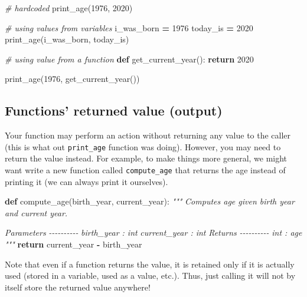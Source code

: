 \documentclass[
]{book}
\newenvironment{Shaded}{\begin{snugshade}}{\end{snugshade}}
\newcommand{\CommentTok}[1]{\textcolor[rgb]{0.56,0.35,0.01}{\textit{#1}}}
\newcommand{\ControlFlowTok}[1]{\textcolor[rgb]{0.13,0.29,0.53}{\textbf{#1}}}
\newcommand{\DecValTok}[1]{\textcolor[rgb]{0.00,0.00,0.81}{#1}}
\newcommand{\KeywordTok}[1]{\textcolor[rgb]{0.13,0.29,0.53}{\textbf{#1}}}
\newcommand{\NormalTok}[1]{#1}
\newcommand{\OperatorTok}[1]{\textcolor[rgb]{0.81,0.36,0.00}{\textbf{#1}}}
\begin{document}
\begin{Shaded}
\begin{Highlighting}[]
\CommentTok{\# hardcoded}
\NormalTok{print\_age(}\DecValTok{1976}\NormalTok{, }\DecValTok{2020}\NormalTok{)}

\CommentTok{\# using values from variables}
\NormalTok{i\_was\_born }\OperatorTok{=} \DecValTok{1976}
\NormalTok{today\_is }\OperatorTok{=} \DecValTok{2020}
\NormalTok{print\_age(i\_was\_born, today\_is)}

\CommentTok{\# using value from a function}
\KeywordTok{def}\NormalTok{ get\_current\_year():}
    \ControlFlowTok{return} \DecValTok{2020}

\NormalTok{print\_age(}\DecValTok{1976}\NormalTok{, get\_current\_year())}
\end{Highlighting}
\end{Shaded}

\hypertarget{functions-returned-value-output}{%
\subsection{Functions' returned value (output)}\label{functions-returned-value-output}}

Your function may perform an action without returning any value to the caller (this is what out \texttt{print\_age} function was doing). However, you may need to return the value instead. For example, to make things more general, we might want write a new function called \texttt{compute\_age} that returns the age instead of printing it (we can always print it ourselves).

\begin{Shaded}
\begin{Highlighting}[]
\KeywordTok{def}\NormalTok{ compute\_age(birth\_year, current\_year):}
    \CommentTok{"""}
\CommentTok{    Computes age given birth year and current year.}

\CommentTok{    Parameters}
\CommentTok{    {-}{-}{-}{-}{-}{-}{-}{-}{-}{-}}
\CommentTok{    birth\_year : int}
\CommentTok{    current\_year : int}
\CommentTok{    }
\CommentTok{    Returns}
\CommentTok{    {-}{-}{-}{-}{-}{-}{-}{-}{-}{-}}
\CommentTok{    int : age}
\CommentTok{    """}
    \ControlFlowTok{return}\NormalTok{ current\_year }\OperatorTok{{-}}\NormalTok{ birth\_year}
\end{Highlighting}
\end{Shaded}

Note that even if a function returns the value, it is retained only if it is actually used (stored in a variable, used as a value, etc.). Thus, just calling it will not by itself store the returned value anywhere!
\end{document}
